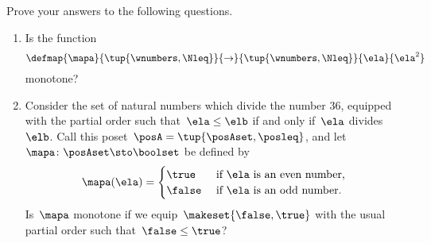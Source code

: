 \clearpage
\vfill
\begin{gradedexercise}
    \label{ex:MonotoneMapCheck?}

    Prove your answers to the following questions.
    \begin{enumerate}
        \item Is the function
              \begin{equation}
                  \defmap{\mapa}{\tup{\wnumbers,\Nleq}}{\to}{\tup{\wnumbers, \Nleq}}{\ela}{\ela^2}
              \end{equation}
              monotone?
        \item Consider the set of natural numbers which divide the number 36, equip\-ped with the partial order such that~$\ela \leq \elb$ if and only if~$\ela$ divides~$\elb$.
              Call this poset~$\posA = \tup{\posAset, \posleq}$, and let~$\mapa \colon \posAset \sto \boolset$ be defined by
              \begin{equation}
                  \mapa(\ela) =
                  \begin{cases}
                      \true  & \text{ if } \ela \text{ is an even number, } \\
                      \false & \text{ if } \ela \text{ is an odd number.
                      }
                  \end{cases}
              \end{equation}
              Is~$\mapa$ monotone if we equip~$\makeset{\false, \true}$ with the usual partial order such that~$\false \leq \true$?
    \end{enumerate}
\end{gradedexercise}

